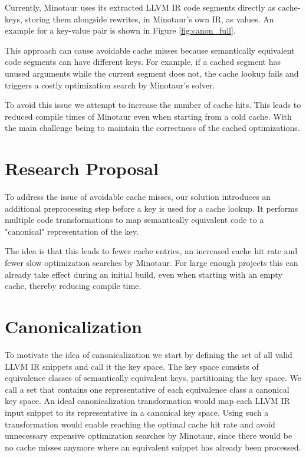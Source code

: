 	Currently, Minotaur uses its extracted LLVM IR code segments directly as cache-keys, storing them alongside rewrites, in Minotaur's own IR, as values.
	An example for a key-value pair is shown in Figure \ref{fig:canon_full}.

	This approach can cause avoidable cache misses because semantically equivalent code segments can have different keys.
	For example, if a cached segment has unused arguments while the current segment does not, the cache lookup fails and triggers a costly optimization search by Minotaur's solver.

	To avoid this issue we attempt to increase the number of cache hits.
	This leads to reduced compile times of Minotaur even when starting from a cold cache.
	With the main challenge being to maintain the correctness of the cached optimizations.

	\section{Research Proposal}

	To address the issue of avoidable cache misses, our solution introduces an additional preprocessing step before a key is used for a cache lookup.
	It performs multiple code transformations to map semantically equivalent code to a "canonical" representation of the key.

	The idea is that this leads to fewer cache entries, an increased cache hit rate and fewer slow optimization searches by Minotaur.
	For large enough projects this can already take effect during an initial build, even when starting with an empty cache, thereby reducing compile time.

	\section{Canonicalization}
	To motivate the idea of canonicalization we start by defining the set of all valid LLVM IR snippets and call it the key space.
	The key space consists of equivalence classes of semantically equivalent keys, partitioning the key space.
	We call a set that contains one representative of each equivalence class a canonical key space.
	An ideal canonicalization transformation would map each LLVM IR input snippet to its representative in a canonical key space.
	Using such a transformation would enable reaching the optimal cache hit rate and avoid unnecessary expensive optimization searches by Minotaur, since there would be no cache misses anymore where an equivalent snippet has already been processed.

